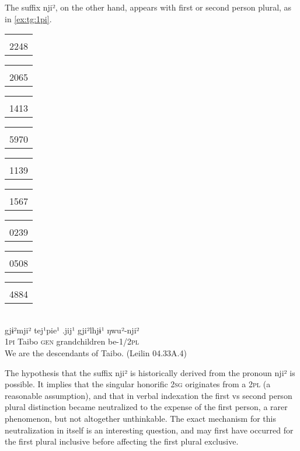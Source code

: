 \documentclass[oldfontcommands,oneside,a4paper,11pt]{article}
\newcommand{\ipa}[1]{{\phon \mbox{#1}}} %
\newcommand{\tgf}[1]{\begin{tabular}{l}\mo{#1}\\{\tiny #1}\end{tabular}}
\begin{document}
The suffix  \ipa{nji²}, on the other hand, appears with first or second person plural, as in \ref{ex:tg:1pi}.

\begin{exe}
\ex \label{ex:tg:1pi}  
\glll 
\tgf{2248}\tgf{2065} 	\tgf{1413}\tgf{5970} 	\tgf{1139} 	\tgf{1567}\tgf{0239} 	\tgf{0508}\tgf{4884} \\
\ipa{gjɨ²mji²} 	\ipa{tej¹pie¹} 	\ipa{.jij¹} 	\ipa{gji²lhjɨ¹} 	\ipa{ŋwu²-nji²} \\
\textsc{1pi} Taibo \textsc{gen} grandchildren be-\textsc{1/2pl} \\
\glt We are the descendants of Taibo. (Leilin 04.33A.4)
\end{exe}

The hypothesis that the suffix  \ipa{nji²} is historically derived from the pronoun  \ipa{nji²} is possible. It implies that the singular honorific \textsc{2sg} originates from a \textsc{2pl} (a reasonable assumption), and that in verbal indexation the first vs second person plural distinction became neutralized to the expense of the first person, a rarer phenomenon, but not altogether unthinkable. The exact mechanism for this neutralization in itself is an interesting question, and may first have occurred for the first plural inclusive before affecting the first plural exclusive.

\end{document}
